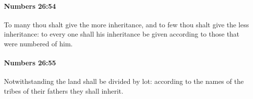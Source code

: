 		\paragraph{Numbers 26:54} %
			\label{NUMBERS-26-54}

			To many thou shalt give the more inheritance, and to few thou shalt give the less inheritance: to every one shall his inheritance be given according to those that were numbered of him.


		\paragraph{Numbers 26:55} %
			\label{NUMBERS-26-55}

			Notwithstanding the land shall be divided by lot: according to the names of the tribes of their fathers they shall inherit.


